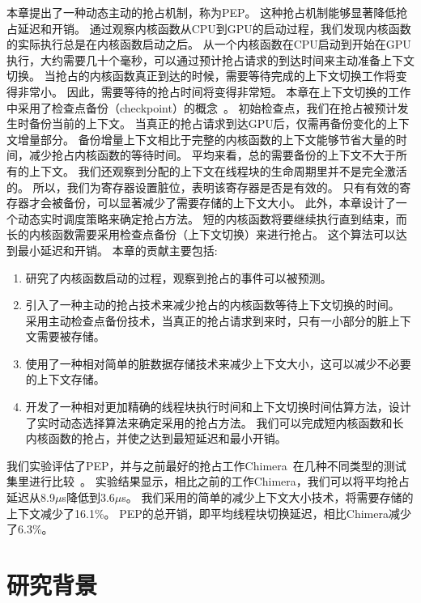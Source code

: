 本章提出了一种动态主动的抢占机制，称为PEP。
这种抢占机制能够显著降低抢占延迟和开销。
通过观察内核函数从CPU到GPU的启动过程，我们发现内核函数的实际执行总是在内核函数启动之后。
从一个内核函数在CPU启动到开始在GPU执行，大约需要几十个毫秒，可以通过预计抢占请求的到达时间来主动准备上下文切换。
当抢占的内核函数真正到达的时候，需要等待完成的上下文切换工作将变得非常小。
因此，需要等待的抢占时间将变得非常短。
本章在上下文切换的工作中采用了检查点备份（checkpoint）的概念~。
初始检查点，我们在抢占被预计发生时备份当前的上下文。
当真正的抢占请求到达GPU后，仅需再备份变化的上下文增量部分。
备份增量上下文相比于完整的内核函数的上下文能够节省大量的时间，减少抢占内核函数的等待时间。
平均来看，总的需要备份的上下文不大于所有的上下文。
我们还观察到分配的上下文在线程块的生命周期里并不是完全激活的。
所以，我们为寄存器设置脏位，表明该寄存器是否是有效的。
只有有效的寄存器才会被备份，可以显著减少了需要存储的上下文大小。
此外，本章设计了一个动态实时调度策略来确定抢占方法。
短的内核函数将要继续执行直到结束，而长的内核函数需要采用检查点备份（上下文切换）来进行抢占。
这个算法可以达到最小延迟和开销。
本章的贡献主要包括:
\renewcommand*\theenumi{(\alph{enumi})}
\begin{enumerate}
\setlength\itemsep{1pt}
\item 研究了内核函数启动的过程，观察到抢占的事件可以被预测。
\item 引入了一种主动的抢占技术来减少抢占的内核函数等待上下文切换的时间。
采用主动检查点备份技术，当真正的抢占请求到来时，只有一小部分的脏上下文需要被存储。
\item 使用了一种相对简单的脏数据存储技术来减少上下文大小，这可以减少不必要的上下文存储。
\item 开发了一种相对更加精确的线程块执行时间和上下文切换时间估算方法，设计了实时动态选择算法来确定采用的抢占方法。
我们可以完成短内核函数和长内核函数的抢占，并使之达到最短延迟和最小开销。
\end{enumerate}

我们实验评估了PEP，并与之前最好的抢占工作Chimera~在几种不同类型的测试集里进行比较~。
实验结果显示，相比之前的工作Chimera，我们可以将平均抢占延迟从8.9$\mu$s降低到3.6$\mu$s。
我们采用的简单的减少上下文大小技术，将需要存储的上下文减少了16.1\%。
PEP的总开销，即平均线程块切换延迟，相比Chimera减少了6.3\%。

\section{研究背景}
\label{sec:pepbackground}

